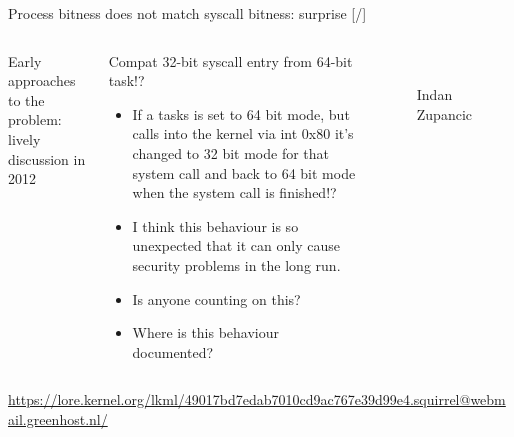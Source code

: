 \documentclass[unicode,aspectratio=169,xcolor={table,dvipsnames,usernames}]{beamer}
\begin{document}
\begin{frame}{Process bitness does not match syscall bitness: surprise \hfill [\insertframenumber/\inserttotalframenumber]}
\Large
\begin{columns}
	\column{11cm}
		{\large Early approaches to the problem: lively discussion in 2012}
		\begin{block}{Compat 32-bit syscall entry from 64-bit task!?}
		\begin{itemize}
			\item If a tasks is set to 64 bit mode, but calls into the kernel via int 0x80
			it's changed to 32 bit mode for that system call and back to 64 bit mode
			when the system call is finished!?

			\item I think this behaviour is so unexpected that it can only cause security
			problems in the long run.

			\item Is anyone counting on this?

			\item Where is this behaviour documented?
		\end{itemize}
		\end{block}
	\column{2.5cm}
		\begin{figure}
			\centering
			 \\
			Indan \\ Zupancic
		\end{figure}
\end{columns}
\bigskip
\tiny
\url{https://lore.kernel.org/lkml/49017bd7edab7010cd9ac767e39d99e4.squirrel@webmail.greenhost.nl/}
\end{frame}
\end{document}
